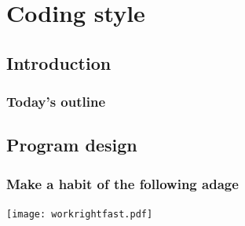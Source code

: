 \section{Coding style}
\subsection*{Introduction}
\begin{frame}[label=contents_prog2]
  \frametitle{Today's outline}
\end{frame}

\subsection*{Program design}
\begin{frame}[label=workrightfast]
  \frametitle{Make a habit of the following adage}
  \begin{center}
    \texttt{[image: workrightfast.pdf]}
  \end{center}
\end{frame}

